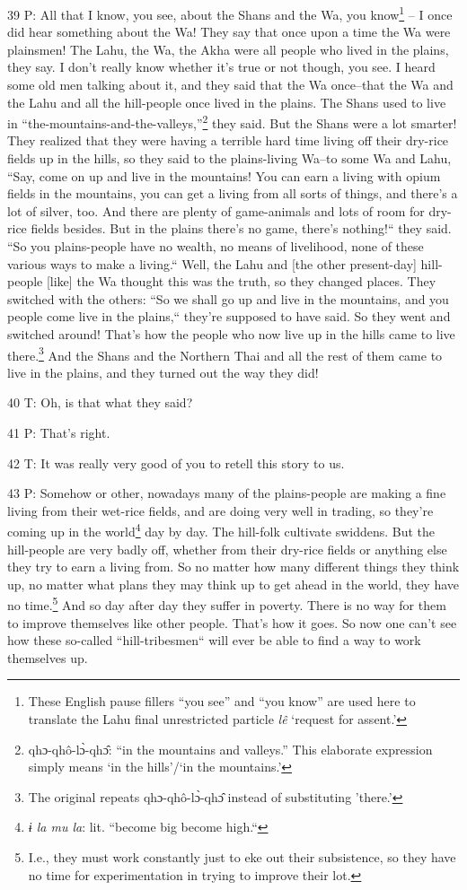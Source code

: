 39 P: All that I know, you see, about the Shans and the Wa, you know\footnote{These English pause fillers ``you see'' and ``you know'' are used here to translate the Lahu final unrestricted particle \textit{lê }`request for assent.'} -- I once
did hear something about the Wa! They say that once upon a time the Wa were plainsmen!
The Lahu, the Wa, the Akha were all people who lived in the plains, they say. I
don't really know whether it's true or not though, you see. I heard some old men
talking about it, and they said that the Wa once--that the Wa and the Lahu and
all the hill-people once lived in the plains. The Shans used to live in ``the-mountains-and-the-valleys,''\footnote{qhɔ-qhô-lɔ̀-qhɔ̂: ``in the mountains and valleys.'' This elaborate expression simply means `in the hills'/`in the mountains.'}
they said. But the Shans were a lot smarter! They realized that they were having
a terrible hard time living off their dry-rice fields up in the hills, so they
said to the plains-living Wa--to some Wa and Lahu, ``Say, come on up and
live in the mountains! You can earn a living with opium fields in the mountains,
you can get a living from all sorts of things, and there's a lot of silver, too.
And there are plenty of game-animals and lots of room for dry-rice fields besides.
But in the plains there's no game, there's nothing!`` they said. ``So
you plains-people have no wealth, no means of livelihood, none of these various
ways to make a living.`` Well, the Lahu and [the other present-day] hill-people
[like] the Wa thought this was the truth, so they changed places. They switched
with the others: ``So we shall go up and live in the mountains, and you people
come live in the plains,`` they're supposed to have said. So they went
and switched around! That's how the people who now live up in the hills came to
live there.\footnote{The original repeats qhɔ-qhô-lɔ̀-qhɔ̂ instead of substituting 'there.'} And the Shans and the Northern Thai and all the rest of them came
to live in the plains, and they turned out the way they did!

40 T: Oh, is that what they said?

41 P: That's right.

42 T: It was really very good of you to retell this story to us.

43 P: Somehow or other, nowadays many of the plains-people are making a fine living
from their wet-rice fields, and are doing very well in trading, so they're coming
up in the world\footnote{\textit{ɨ la mu la}: lit. ``become big become high.``} day by day. The hill-folk cultivate swiddens. But the hill-people
are very badly off, whether from their dry-rice fields or anything else they try
to earn a living from. So no matter how many different things they think up, no
matter what plans they may think up to get ahead in the world, they have no time.\footnote{I.e., they must work constantly just to eke out their subsistence, so they have no time for experimentation in trying to improve their lot.}
And so day after day they suffer in poverty. There is no way for them to improve
themselves like other people. That's how it goes. So now one can't see how these
so-called ``hill-tribesmen`` will ever be able to find a way to
work themselves up.

